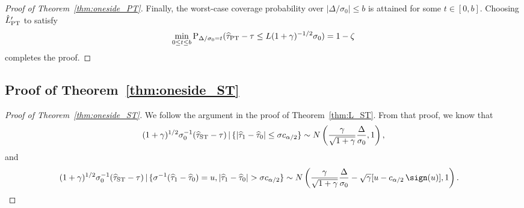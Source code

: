 \documentclass[11pt]{article}
\def\given{\,|\,}
\def\P{{\mathrm P}}
\newcommand{\htau}{\widehat\tau}
\numberwithin{equation}{section}
\theoremstyle{definition}
\begin{document}
\begin{proof}[Proof of Theorem~\ref{thm:oneside_PT}]
Finally, the worst-case coverage probability over $\lvert \Delta/\sigma_0 \rvert \le b$ is attained for some $t\in[0,b]$. Choosing $\hat L_{\rm PT}'$ to satisfy
\[
  \min_{0 \le t \le b}\P_{\Delta/\sigma_0 = t}(\htau_{\rm PT} - \tau \le L (1+\gamma)^{-1/2} \sigma_0) = 1-\zeta
\]
completes the proof.

\end{proof}

\subsection{Proof of Theorem~\ref{thm:oneside_ST}}

\begin{proof}[Proof of Theorem~\ref{thm:oneside_ST}]

We follow the argument in the proof of Theorem~\ref{thm:L_ST}. From that proof, we know that
\begin{align*}
  (1+\gamma)^{1/2} \sigma_0^{-1} (\htau_{\rm ST} - \tau) \given \{\lvert \htau_1 - \htau_0 \rvert \le \sigma c_{\alpha/2}\} \sim N\left(\frac{\gamma}{\sqrt{1+\gamma}} \frac{\Delta}{\sigma_0}, 1\right),
\end{align*}
and
\begin{align*}
  &(1+\gamma)^{1/2} \sigma_0^{-1} (\htau_{\rm ST} - \tau) \given \{\sigma^{-1}(\htau_1 - \htau_0) = u, \lvert \htau_1 - \htau_0 \rvert > \sigma c_{\alpha/2}\} \sim N\left(\frac{\gamma}{\sqrt{1+\gamma}} \frac{\Delta}{\sigma_0} - \sqrt{\gamma} [u - c_{\alpha/2}\,\sign(u)], 1\right).
\end{align*}


\end{proof}
\end{document}

